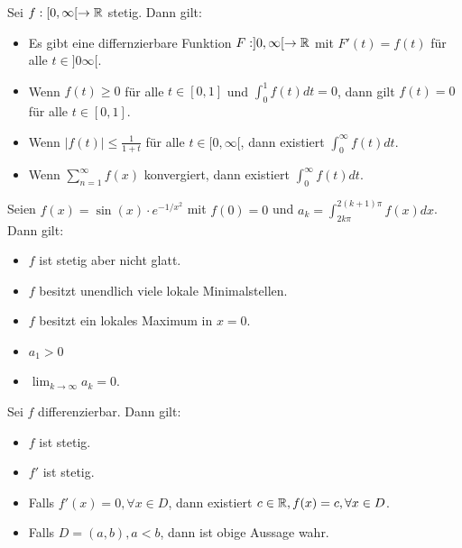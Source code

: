 Sei $f : [0, \infty[ \to \mathbb{R}$ stetig. Dann gilt:
\begin{itemize}
    \item[\rlap{\raisebox{0.3ex}{\hspace{0.4ex}\tiny \ding{52}}}$\square$]
    Es gibt eine differnzierbare Funktion $F : ]0, \infty[ \to \mathbb{R}$ mit $F'(t) = f(t)$ für alle $t \in ]0 \infty[$.
    \item[\rlap{\raisebox{0.3ex}{\hspace{0.4ex}\tiny \ding{52}}}$\square$]
    Wenn $f(t) \geq 0$ für alle $t \in [0,1]$ und $\int_0^1 f(t)dt = 0$, dann gilt $f(t) = 0$ für alle
    $t \in [0,1]$.
    \item[$\square$]
    Wenn $|f(t)| \leq \frac{1}{1+ t}$ für alle $t \in [0, \infty[$, dann existiert $\int_0^\infty f(t)dt$.
    \item[$\square$]
    Wenn $\sum_{n = 1}^\infty f(x)$ konvergiert, dann existiert $\int_0^\infty f(t)dt$.
\end{itemize}


Seien $f(x) = \sin(x) \cdot e^{-1/x^2}$ mit $f(0) = 0$ und $a_k = \int_{2k\pi}^{2(k+1)\pi} f(x)dx$. Dann gilt:
\begin{itemize}
    \item[$\square$]
    $f$ ist stetig aber nicht glatt.
    \item[\rlap{\raisebox{0.3ex}{\hspace{0.4ex}\tiny \ding{52}}}$\square$]
    $f$ besitzt unendlich viele lokale Minimalstellen.
    \item[$\square$]
    $f$ besitzt ein lokales Maximum in $x = 0$.
    \item[$\square$]
    $a_1 > 0$ 
    \item[\rlap{\raisebox{0.3ex}{\hspace{0.4ex}\tiny \ding{52}}}$\square$]
    $\lim_{k \to \infty} a_k = 0$.
\end{itemize}

Sei $f$ differenzierbar. Dann gilt:
\begin{itemize}
    \item[\rlap{\raisebox{0.3ex}{\hspace{0.4ex}\tiny \ding{52}}}$\square$]
    $f$ ist stetig.
    \item[$\square$]
    $f'$ ist stetig.
    \item[$\square$]
    Falls $f'(x) = 0, \forall x \in D$, dann existiert $c \in \mathbb{R}, f(x) = c, \forall x \in D$.
    \item[\rlap{\raisebox{0.3ex}{\hspace{0.4ex}\tiny \ding{52}}}$\square$]
    Falls $D = (a,b), a < b$, dann ist obige Aussage wahr.
\end{itemize}

